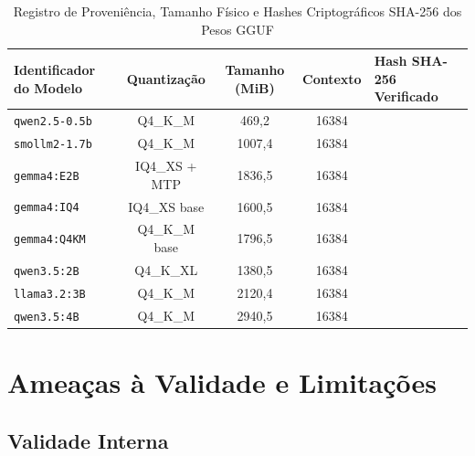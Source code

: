 \documentclass[10pt,a4paper,twocolumn]{article}
\begin{document}
\begin{table}[t]
\centering
\footnotesize
\setlength{\tabcolsep}{1.5pt}
\caption{Registro de Proveni\^encia, Tamanho F\'isico e Hashes Criptogr\'aficos SHA-256 dos Pesos GGUF}
\label{tab:model_provenance}
\begin{tabularx}{\textwidth}{L{2.3cm} c c c >{\raggedright\arraybackslash}X}
\toprule
\textbf{Identificador do Modelo} & \textbf{Quantiza\c{c}\~ao} & \textbf{Tamanho (MiB)} & \textbf{Contexto} & \textbf{Hash SHA-256 Verificado} \\
\midrule
\texttt{qwen2.5-0.5b} & Q4\_K\_M & 469,2 & 16384 & {\scriptsize\texttt{}} \\
\texttt{smollm2-1.7b} & Q4\_K\_M & 1007,4 & 16384 & {\scriptsize\texttt{}} \\
\texttt{gemma4:E2B} & IQ4\_XS + MTP & 1836,5 & 16384 & {\scriptsize\texttt{}} \\
\texttt{gemma4:IQ4} & IQ4\_XS base & 1600,5 & 16384 & {\scriptsize\texttt{}} \\
\texttt{gemma4:Q4KM} & Q4\_K\_M base & 1796,5 & 16384 & {\scriptsize\texttt{}} \\
\texttt{qwen3.5:2B} & Q4\_K\_XL & 1380,5 & 16384 & {\scriptsize\texttt{}} \\
\texttt{llama3.2:3B} & Q4\_K\_M & 2120,4 & 16384 & {\scriptsize\texttt{}} \\
\texttt{qwen3.5:4B} & Q4\_K\_M & 2940,5 & 16384 & {\scriptsize\texttt{}} \\
\bottomrule
\end{tabularx}
\end{table}

\section{Amea\c{c}as \`a Validade e Limita\c{c}\~oes}

\subsection{Validade Interna}
\end{document}

